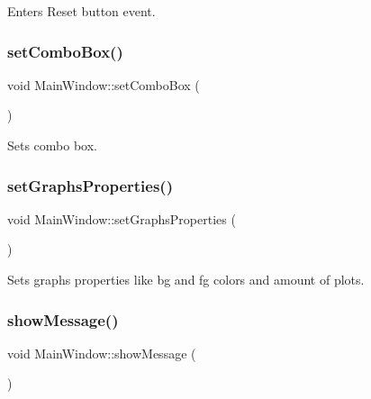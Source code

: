 Enters Reset button event. 

\mbox{\label{class_main_window_ad5f5900379db4ae670ad541da8f55384}} 
\subsubsection{\texorpdfstring{set\+Combo\+Box()}{setComboBox()}}
{\footnotesize\ttfamily void Main\+Window\+::set\+Combo\+Box (\begin{DoxyParamCaption}{ }\end{DoxyParamCaption})\hspace{0.3cm}{\ttfamily [private]}}



Sets combo box. 

\mbox{\label{class_main_window_a9a1bad7a80ca8e1c5075d80143957754}} 
\subsubsection{\texorpdfstring{set\+Graphs\+Properties()}{setGraphsProperties()}}
{\footnotesize\ttfamily void Main\+Window\+::set\+Graphs\+Properties (\begin{DoxyParamCaption}{ }\end{DoxyParamCaption})\hspace{0.3cm}{\ttfamily [private]}}



Sets graphs properties like bg and fg colors and amount of plots. 

\mbox{\label{class_main_window_a366da6a45407c523f570ca9e4f4b40a4}} 
\subsubsection{\texorpdfstring{show\+Message()}{showMessage()}\hspace{0.1cm}{\footnotesize\ttfamily [1/2]}}
{\footnotesize\ttfamily void Main\+Window\+::show\+Message (\begin{DoxyParamCaption}{ }\end{DoxyParamCaption})\hspace{0.3cm}{\ttfamily [private]}}



